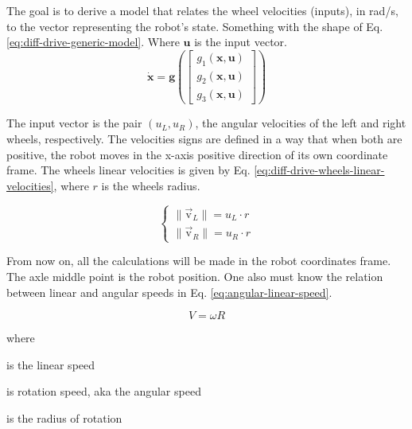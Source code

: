 \documentclass[12pt]{article}
\begin{document}
The goal is to derive a model that relates the wheel velocities (inputs), in \si[per-mode=symbol]{\radian\per\second}, to the vector representing the robot's state. Something with the shape of Eq. \ref{eq:diff-drive-generic-model}. Where $\mathbf{u}$ is the input vector.
\begin{equation}
    \mathbf{\dot{x}} = \boldsymbol{g}\left( \begin{bmatrix}
        g_1(\mathbf{x}, \mathbf{u}) \\ g_2(\mathbf{x}, \mathbf{u}) \\ g_3(\mathbf{x}, \mathbf{u})\end{bmatrix} \right)
    \label{eq:diff-drive-generic-model}
\end{equation}

The input vector is the pair $(u_L, u_R)$, the angular velocities of the left and right wheels, respectively. The velocities signs are defined in a way that when both are positive, the robot moves in the x-axis positive direction of its own coordinate frame. The wheels linear velocities is given by Eq. \ref{eq:diff-drive-wheels-linear-velocities}, where $r$ is the wheels radius.

\begin{equation}
\begin{cases}
    \lVert \vec{\mathrm{v}}_L \rVert = u_L \cdot r\\
    \lVert \vec{\mathrm{v}}_R \rVert = u_R \cdot r
\end{cases}
    \label{eq:diff-drive-wheels-linear-velocities}
\end{equation}

From now on, all the calculations will be made in the robot coordinates frame. The axle middle point is the robot position. One also must know the relation between linear and angular speeds in Eq. \ref{eq:angular-linear-speed}.

\begin{equation}
    V = \omega R
    \label{eq:angular-linear-speed}
\end{equation}

\noindent where
\begin{description}[labelindent=10pt, labelsep=10pt]
    \item[$V$] is the linear speed
    \item[$\omega$] is rotation speed, aka the angular speed
    \item[$R$] is the radius of rotation
\end{description}
\end{document}
